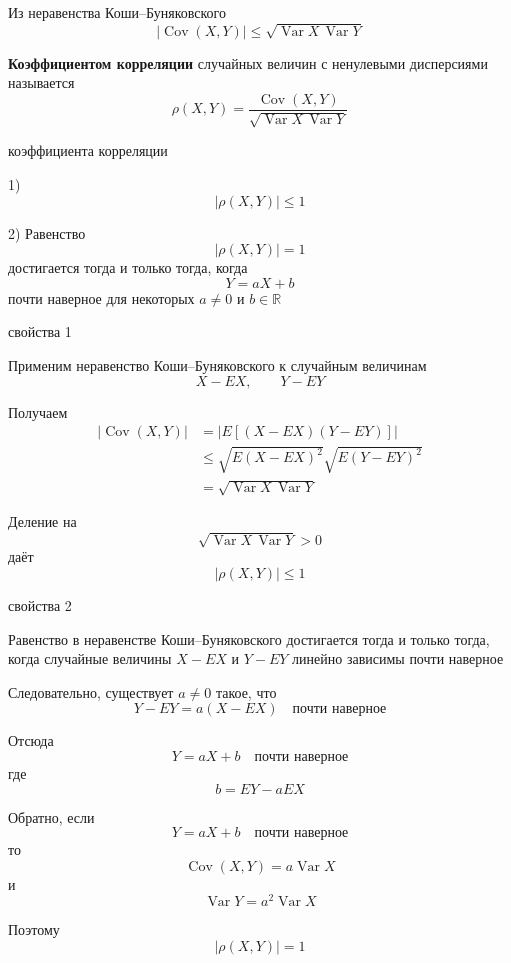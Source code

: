 \documentclass[12pt,a4paper]{article}
\begin{document}
Из неравенства Коши--Буняковского
\[
|\operatorname{Cov}(X,Y)|
\leq
\sqrt{\operatorname{Var}X\,\operatorname{Var}Y}
\]

\begin{definition}

\textbf{Коэффициентом корреляции} случайных величин с ненулевыми дисперсиями называется
\[
\rho(X,Y)
=
\frac{\operatorname{Cov}(X,Y)}
{\sqrt{\operatorname{Var}X\,\operatorname{Var}Y}}
\]

\end{definition}

\begin{props}{коэффициента корреляции}

1)
\[
|\rho(X,Y)|\leq1
\]

\medskip

2) Равенство
\[
|\rho(X,Y)|=1
\]
достигается тогда и только тогда, когда
\[
Y=aX+b
\]
почти наверное для некоторых $a\neq0$ и $b\in\mathbb{R}$

\end{props}

\begin{proofbox}{свойства 1}

Применим неравенство Коши--Буняковского к случайным величинам
\[
X-EX,
\qquad
Y-EY
\]

Получаем
\[
\begin{aligned}
|\operatorname{Cov}(X,Y)|
&=
|E[(X-EX)(Y-EY)]|\\
&\leq
\sqrt{E(X-EX)^2}
\sqrt{E(Y-EY)^2}\\
&=
\sqrt{\operatorname{Var}X\,\operatorname{Var}Y}
\end{aligned}
\]

Деление на
\[
\sqrt{\operatorname{Var}X\,\operatorname{Var}Y}>0
\]
даёт
\[
|\rho(X,Y)|\leq1
\]

\end{proofbox}

\begin{proofbox}{свойства 2}

Равенство в неравенстве Коши--Буняковского достигается тогда и только тогда, когда случайные величины $X-EX$ и $Y-EY$ линейно зависимы почти наверное

Следовательно, существует $a\neq0$ такое, что
\[
Y-EY=a(X-EX)
\quad\text{почти наверное}
\]

Отсюда
\[
Y=aX+b
\quad\text{почти наверное}
\]
где
\[
b=EY-aEX
\]

Обратно, если
\[
Y=aX+b
\quad\text{почти наверное}
\]
то
\[
\operatorname{Cov}(X,Y)
=
a\operatorname{Var}X
\]
и
\[
\operatorname{Var}Y
=
a^2\operatorname{Var}X
\]

Поэтому
\[
|\rho(X,Y)|=1
\]

\end{proofbox}
\end{document}
